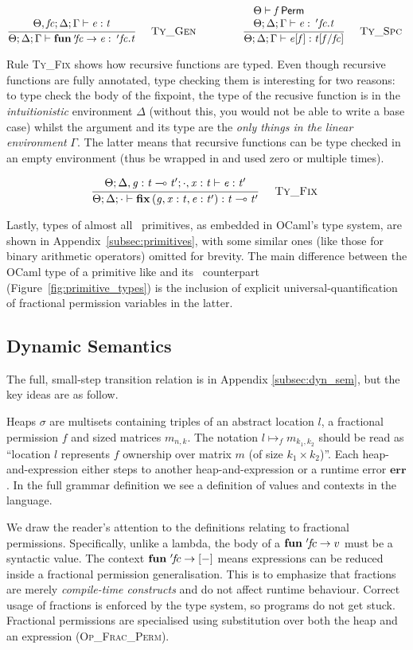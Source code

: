 \vspace{-\baselineskip}
\[
    {\displaystyle\frac{\begin{array}{l} \Theta , \mathit{fc} ; \Delta ; \Gamma \vdash \mathit{e} : \mathit{t} \\ \end{array}}{ \Theta ; \Delta ; \Gamma \vdash \mathbf{fun} {\: '\! \mathit{fc} } \rightarrow \mathit{e} : \: '\! \, \mathit{fc} . \mathit{t}}\quad\textsc{ {\textsc{Ty\_Gen}}{} }} \qquad\qquad {\displaystyle\frac{\begin{array}{l}  \Theta \vdash \mathit{f} \, \textsf{Perm} \\  \Theta ; \Delta ; \Gamma \vdash \mathit{e} : \: '\! \, \mathit{fc} . \mathit{t} \\ \end{array}}{ \Theta ; \Delta ; \Gamma \vdash \mathit{e} [ \mathit{f} ] : \mathit{t} [ \mathit{f} / \mathit{fc} ]}\quad\textsc{ {\textsc{Ty\_Spc}}{} }}
\]

Rule \textsc{Ty\_Fix} shows how recursive functions are typed. Even though
recursive functions are fully annotated, type checking them is interesting for
two reasons: to type check the body of the fixpoint, the type of the recusive
function is in the \emph{intuitionistic} environment $\Delta$ (without this,
you would not be able to write a base case) whilst the argument and its type
are the \emph{only things in the linear environment} $\Gamma$. The latter means
that recursive functions can be type checked in an empty environment (thus be
wrapped in  and used zero or multiple times).

\vspace{-\baselineskip}
\[
    {\displaystyle\frac{\begin{array}{l} \Theta ; \Delta , \mathit{g} : \mathit{t} \multimap \mathit{t'} ; \cdot , \mathit{x} : \mathit{t} \vdash \mathit{e} : \mathit{t'} \\ \end{array}}{ \Theta ; \Delta ; \cdot \vdash \mathbf{fix} \, ( \mathit{g} , \mathit{x} : \mathit{t} , \mathit{e} : \mathit{t'} ) : \mathit{t} \multimap \mathit{t'}}\quad\textsc{ {\textsc{Ty\_Fix}}{} }}
\]

Lastly, types of almost all \lang\ primitives, as embedded in OCaml's type
system, are shown in Appendix~\ref{subsec:primitives}, with some similar ones
(like those for binary arithmetic operators) omitted for brevity. The main
difference between the OCaml type of a primitive like  and its
\lang\ counterpart (Figure~\ref{fig:primitive_types}) is the inclusion of
explicit universal-quantification of fractional permission variables in the
latter.

\subsection{Dynamic Semantics}\label{subsec:semantics}

The full, small-step transition relation is in Appendix \ref{subsec:dyn_sem},
but the key ideas are as follow.

Heaps $\sigma$ are multisets containing triples of an abstract location $l$,
a fractional permission $f$ and sized matrices $m_{n,k}$. The notation $l
\mapsto_f m_{k_1, k_2}$ should be read as ``location $l$ represents $f$
ownership over matrix $m$ (of size $k_1 \times k_2$)''.  Each heap-and-expression
either steps to another heap-and-expression or a runtime error $\mathbf{err}$.
In the full grammar definition we see a definition of values and contexts in
the language.

We draw the reader's attention to the definitions relating to fractional
permissions. Specifically, unlike a lambda, the body of a $\mathbf{fun}\ '\!f\!c
\rightarrow v$ must be a syntactic value. The context $\mathbf{fun}\ '\!f\!c
\rightarrow [-]$ means expressions can be reduced inside a fractional
permission generalisation. This is to emphasize that fractions are merely
\emph{compile-time constructs} and do not affect runtime behaviour. Correct
usage of fractions is enforced by the type system, so programs do not get
stuck. Fractional permissions are specialised using substitution over both the
heap and an expression (\textsc{Op\_Frac\_Perm}).

